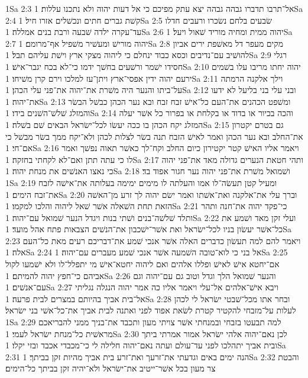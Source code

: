 1Sa 2:3  אל־תרבו תדברו גבהה גבהה יצא עתק מפיכם כי אל דעות יהוה ולא נתכנו עללות׃
1Sa 2:4  קשׁת גברים חתים ונכשׁלים אזרו חיל׃
1Sa 2:5  שׂבעים בלחם נשׂכרו ורעבים חדלו עד־עקרה ילדה שׁבעה ורבת בנים אמללה׃
1Sa 2:6  יהוה ממית ומחיה מוריד שׁאול ויעל׃
1Sa 2:7  יהוה מורישׁ ומעשׁיר משׁפיל אף־מרומם׃
1Sa 2:8  מקים מעפר דל מאשׁפת ירים אביון להושׁיב עם־נדיבים וכסא כבוד ינחלם כי ליהוה מצקי ארץ וישׁת עליהם תבל׃
1Sa 2:9  רגלי חסידו ישׁמר ורשׁעים בחשׁך ידמו כי־לא בכח יגבר־אישׁ׃
1Sa 2:10  יהוה יחתו מריבו עלו בשׁמים ירעם יהוה ידין אפסי־ארץ ויתן־עז למלכו וירם קרן משׁיחו׃
1Sa 2:11  וילך אלקנה הרמתה על־ביתו והנער היה משׁרת את־יהוה את־פני עלי הכהן׃
1Sa 2:12  ובני עלי בני בליעל לא ידעו את־יהוה׃
1Sa 2:13  ומשׁפט הכהנים את־העם כל־אישׁ זבח זבח ובא נער הכהן כבשׁל הבשׂר והמזלג שׁלשׁ־השׁנים בידו׃
1Sa 2:14  והכה בכיור או בדוד או בקלחת או בפרור כל אשׁר יעלה המזלג יקח הכהן בו ככה יעשׂו לכל־ישׂראל הבאים שׁם בשׁלה׃
1Sa 2:15  גם בטרם יקטרון את־החלב ובא נער הכהן ואמר לאישׁ הזבח תנה בשׂר לצלות לכהן ולא־יקח ממך בשׂר מבשׁל כי אם־חי׃
1Sa 2:16  ויאמר אליו האישׁ קטר יקטירון כיום החלב וקח־לך כאשׁר תאוה נפשׁך ואמר לו כי עתה תתן ואם־לא לקחתי בחזקה׃
1Sa 2:17  ותהי חטאת הנערים גדולה מאד את־פני יהוה כי נאצו האנשׁים את מנחת יהוה׃
1Sa 2:18  ושׁמואל משׁרת את־פני יהוה נער חגור אפוד בד׃
1Sa 2:19  ומעיל קטן תעשׂה־לו אמו והעלתה לו מימים ימימה בעלותה את־אישׁה לזבח את־זבח הימים׃
1Sa 2:20  וברך עלי את־אלקנה ואת־אשׁתו ואמר ישׂם יהוה לך זרע מן־האשׁה הזאת תחת השׁאלה אשׁר שׁאל ליהוה והלכו למקמו׃
1Sa 2:21  כי־פקד יהוה את־חנה ותהר ותלד שׁלשׁה־בנים ושׁתי בנות ויגדל הנער שׁמואל עם־יהוה׃
1Sa 2:22  ועלי זקן מאד ושׁמע את כל־אשׁר יעשׂון בניו לכל־ישׂראל ואת אשׁר־ישׁכבון את־הנשׁים הצבאות פתח אהל מועד׃
1Sa 2:23  ויאמר להם למה תעשׂון כדברים האלה אשׁר אנכי שׁמע את־דבריכם רעים מאת כל־העם אלה׃
1Sa 2:24  אל בני כי לוא־טובה השׁמעה אשׁר אנכי שׁמע מעברים עם־יהוה׃
1Sa 2:25  אם־יחטא אישׁ לאישׁ ופללו אלהים ואם ליהוה יחטא־אישׁ מי יתפלל־לו ולא ישׁמעו לקול אביהם כי־חפץ יהוה להמיתם׃
1Sa 2:26  והנער שׁמואל הלך וגדל וטוב גם עם־יהוה וגם עם־אנשׁים׃
1Sa 2:27  ויבא אישׁ־אלהים אל־עלי ויאמר אליו כה אמר יהוה הנגלה נגליתי אל־בית אביך בהיותם במצרים לבית פרעה׃
1Sa 2:28  ובחר אתו מכל־שׁבטי ישׂראל לי לכהן לעלות על־מזבחי להקטיר קטרת לשׂאת אפוד לפני ואתנה לבית אביך את־כל־אשׁי בני ישׂראל׃
1Sa 2:29  למה תבעטו בזבחי ובמנחתי אשׁר צויתי מעון ותכבד את־בניך ממני להבריאכם מראשׁית כל־מנחת ישׂראל לעמי׃
1Sa 2:30  לכן נאם־יהוה אלהי ישׂראל אמור אמרתי ביתך ובית אביך יתהלכו לפני עד־עולם ועתה נאם־יהוה חלילה לי כי־מכבדי אכבד ובזי יקלו׃
1Sa 2:31  הנה ימים באים וגדעתי את־זרעך ואת־זרע בית אביך מהיות זקן בביתך׃
1Sa 2:32  והבטת צר מעון בכל אשׁר־ייטיב את־ישׂראל ולא־יהיה זקן בביתך כל־הימים׃
